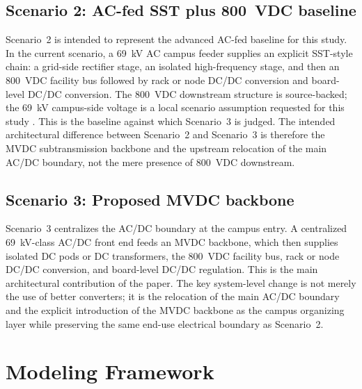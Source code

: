 \documentclass[11pt]{article}
\begin{document}
\subsection{Scenario 2: AC-fed SST plus 800~VDC baseline}
Scenario~2 is intended to represent the advanced AC-fed baseline for this study. In the current scenario, a 69~kV AC campus feeder supplies an explicit SST-style chain: a grid-side rectifier stage, an isolated high-frequency stage, and then an 800~VDC facility bus followed by rack or node DC/DC conversion and board-level DC/DC conversion. The 800~VDC downstream structure is source-backed; the 69~kV campus-side voltage is a local scenario assumption requested for this study \cite{NVIDIA2025HVDCBlog}. This is the baseline against which Scenario~3 is judged. The intended architectural difference between Scenario~2 and Scenario~3 is therefore the MVDC subtransmission backbone and the upstream relocation of the main AC/DC boundary, not the mere presence of 800~VDC downstream.

\subsection{Scenario 3: Proposed MVDC backbone}
Scenario~3 centralizes the AC/DC boundary at the campus entry. A centralized 69~kV-class AC/DC front end feeds an MVDC backbone, which then supplies isolated DC pods or DC transformers, the 800~VDC facility bus, rack or node DC/DC conversion, and board-level DC/DC regulation. This is the main architectural contribution of the paper. The key system-level change is not merely the use of better converters; it is the relocation of the main AC/DC boundary and the explicit introduction of the MVDC backbone as the campus organizing layer while preserving the same end-use electrical boundary as Scenario~2.

\section{Modeling Framework}
\end{document}
